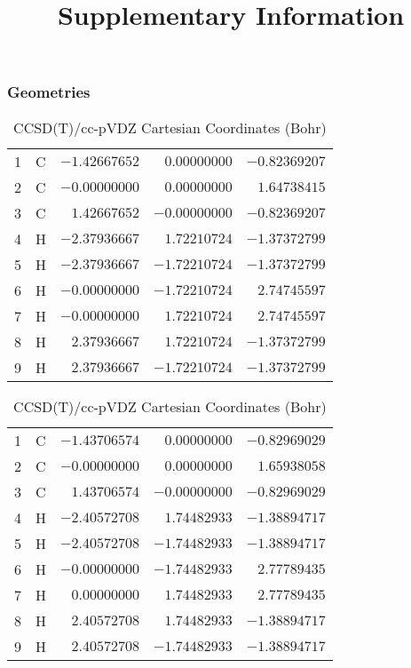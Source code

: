 \documentclass[10pt,oneside]{article}
\title{Supplementary Information}
\author{}
\date{}
\begin{document}
\maketitle

\tableofcontents

\newpage

\subsection{}

\begin{table}[h!]
\subsubsection*{Geometries}
\begin{multicols}{2}
\centering
\caption{CCSD(T)/cc-pVTZ Cartesian Coordinates (Bohr)}
\begin{tabular}{llrrr}
\toprule
1  & C  & $-1.42667652$ & $ 0.00000000$ & $-0.82369207$ \\
2  & C  & $-0.00000000$ & $ 0.00000000$ & $ 1.64738415$ \\
3  & C  & $ 1.42667652$ & $-0.00000000$ & $-0.82369207$ \\
4  & H  & $-2.37936667$ & $ 1.72210724$ & $-1.37372799$ \\
5  & H  & $-2.37936667$ & $-1.72210724$ & $-1.37372799$ \\
6  & H  & $-0.00000000$ & $-1.72210724$ & $ 2.74745597$ \\
7  & H  & $-0.00000000$ & $ 1.72210724$ & $ 2.74745597$ \\
8  & H  & $ 2.37936667$ & $ 1.72210724$ & $-1.37372799$ \\
9  & H  & $ 2.37936667$ & $-1.72210724$ & $-1.37372799$ \\
\bottomrule
\end{tabular}
\caption{CCSD(T)/cc-pVDZ Cartesian Coordinates (Bohr)}
\begin{tabular}{llrrr}
\toprule
1  & C  & $-1.43706574$ & $ 0.00000000$ & $-0.82969029$ \\
2  & C  & $-0.00000000$ & $ 0.00000000$ & $ 1.65938058$ \\
3  & C  & $ 1.43706574$ & $-0.00000000$ & $-0.82969029$ \\
4  & H  & $-2.40572708$ & $ 1.74482933$ & $-1.38894717$ \\
5  & H  & $-2.40572708$ & $-1.74482933$ & $-1.38894717$ \\
6  & H  & $-0.00000000$ & $-1.74482933$ & $ 2.77789435$ \\
7  & H  & $ 0.00000000$ & $ 1.74482933$ & $ 2.77789435$ \\
8  & H  & $ 2.40572708$ & $ 1.74482933$ & $-1.38894717$ \\
9  & H  & $ 2.40572708$ & $-1.74482933$ & $-1.38894717$ \\
\bottomrule
\end{tabular}
\end{multicols}
\end{table}
\end{document}

